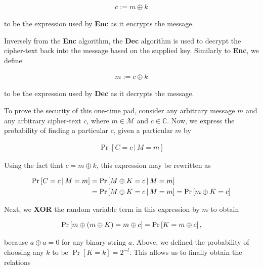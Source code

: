 \documentclass{article}[12]
\numberwithin{equation}{section}
\begin{document}
\begin{flushleft}
\begin{align*}
c := m \oplus k
\end{align*}

to be the expression used by {\selectfont \textbf{Enc}} as it encrypts the message. \newline


Inversely from the {\selectfont \textbf{Enc}} algorithm, the {\selectfont \textbf{Dec}} algorithm is used to decrypt the cipher-text back into the message based on the supplied key.  Similarly to {\selectfont \textbf{Enc}}, we define

\begin{align*}
m := c \oplus k
\end{align*}

to be the expression used by {\selectfont \textbf{Dec}} as it decrypts the message. \newline

To prove the security of this one-time pad, consider any arbitrary message $m$ and any arbitrary cipher-text $c$, where $m \in \mathcal{M}$ and $c \in \mathbb{C}$. Now, we express the probability of finding a particular $c$, given a particular $m$ by

\begin{align}
\Pr \left[ C = c \, \vert \, M = m \right] \label{eq2}
\end{align}

Using the fact that $c = m \oplus k$, this expression may be rewritten as

\begin{align}
\Pr \left[ C = c \, \vert \, M = m \right] &= \Pr \left[ M \oplus K = c \, \vert \, M = m \right] \notag \\
&= \Pr \left[ M \oplus K = c \, \vert \, M = m \right] = \Pr \left[ m \oplus K = c \right] \notag
\end{align}

Next, we \textbf{XOR} the random variable term in this expression by $m$ to obtain

\begin{align}
\Pr \left[ m \oplus \left( m \oplus K \right) = m \oplus c \right] = \Pr \left[ K = m \oplus c \right], \notag
\end{align}

because $a \oplus a = 0$ for any binary string $a$.  Above, we defined the probability of choosing any $k$ to be $\Pr \left[ K = k \right] = 2^{-l}$.  This allows us to finally obtain the relations


\end{flushleft}
\end{document}
